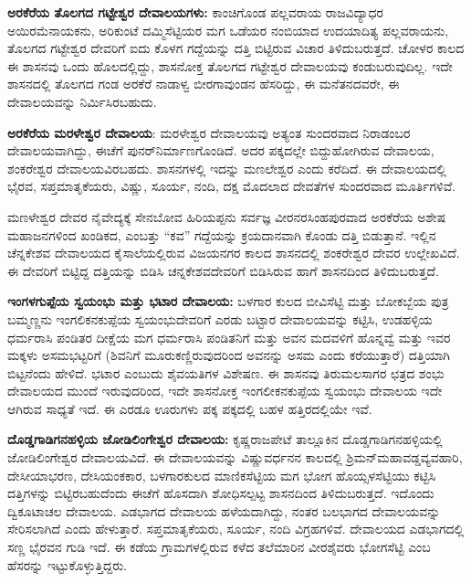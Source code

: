 \textbf{ಅರಕೆರೆಯ ತೊಲಗದ ಗಟ್ಟೇಶ್ವರ ದೇವಾಲಯಗಳು: } ಕಾಂಚಿಗೊಂಡ ಪಲ್ಲವರಾಯ ರಾಜವಿದ್ಯಾಧರ ಅಯಿರಮೆನಾಯಕನು, ಅರಿಕುಂಟೆ ದಮ್ಮಿಸೆಟ್ಟಿಯರ ಮಗ ಒಡೆಯರ ನಂಬಿಯಾದ ಉದಯಾದಿತ್ಯ ಪಲ್ಲವರಾಯನು, ತೊಲಗದ ಗಟ್ಟೇಶ್ವರ ದೇವರಿಗೆ ಐದು ಕೊಳಗ ಗದ್ದೆಯನ್ನು ದತ್ತಿ ಬಿಟ್ಟಿರುವ ವಿಚಾರ ತಿಳಿದುಬರುತ್ತದೆ. ಚೋಳರ ಕಾಲದ ಈ ಶಾಸನವು ಒಂದು ಹೊಲದಲ್ಲಿದ್ದು, ಶಾಸನೋಕ್ತ ತೊಲಗದ ಗಟ್ಟೇಶ್ವರ ದೇವಾಲಯವು ಕಂಡುಬರುವುದಿಲ್ಲ. ಇದೇ ಶಾಸನದಲ್ಲಿ ತೊಲಗದ ಗಂಡ ಅರಕೆರೆ ನಾಡಾಳ್ವ ಬೀರಗಾವುಂಡನ ಹೆಸರಿದ್ದು, ಈ ಮನೆತನದವರೇ, ಈ ದೇವಾಲಯವನ್ನು ನಿರ್ಮಿಸಿರಬಹುದು.

\textbf{ಅರಕೆರೆಯ ಮರಳೇಶ್ವರ ದೇವಾಲಯ}: ಮರಳೇಶ್ವರ ದೇವಾಲಯವು ಅತ್ಯಂತ ಸುಂದರವಾದ ನಿರಾಡಂಬರ ದೇವಾಲಯವಾಗಿದ್ದು, ಈಚೆಗೆ ಪುನರ್​ನಿರ್ಮಾಣಗೊಂಡಿದೆ. ಅದರ ಪಕ್ಕದಲ್ಲೇ ಬಿದ್ದುಹೋಗಿರುವ ದೇವಾಲಯ, ಶಂಕರೇಶ್ವರ ದೇವಾಲಯವಿರಬಹದು. ಶಾಸನಗಳಲ್ಲಿ ಇದನ್ನು ಮಣಲೇಶ್ವರ ಎಂದು ಕರೆದಿದೆ. ಈ ದೇವಾಲಯದಲ್ಲಿ ಭೈರವ, ಸಪ್ತಮಾತೃಕೆಯರು, ವಿಷ್ಣು, ಸೂರ್ಯ, ನಂದಿ, ದಕ್ಷ ಮೊದಲಾದ ದೇವತೆಗಳ ಸುಂದರವಾದ ಮೂರ್ತಿಗಳಿವೆ.

ಮಣಳೇಶ್ವರ ದೇವರ ನೈವೇದ್ಯಕ್ಕೆ ಸೇನಬೋವ ಹಿರಿಯಪ್ಪನು ಸರ್ವಜ್ಞ ವೀರನರಸಿಂಹಪುರವಾದ ಅರಕೆರೆಯ ಅಶೇಷ ಮಹಾಜನಗಳಿಂದ ಖಂಡಿಕದ, ಎಂಬತ್ತು “ಕವ” ಗದ್ದೆಯನ್ನು ಕ್ರಯದಾನವಾಗಿ ಕೊಂಡು ದತ್ತಿ ಬಿಡುತ್ತಾನೆ. ಇಲ್ಲಿನ ಚೆನ್ನಕೇಶವ ದೇವಾಲಯದ ಕೈಸಾಲೆಯಲ್ಲಿರುವ ವಿಜಯನಗರ ಕಾಲದ ಶಾಸನದಲ್ಲಿ ಶಂಕರೇಶ್ವರ ದೇವರ ಉಲ್ಲೇಖವಿದೆ. ಈ ದೇವರಿಗೆ ಬಿಟ್ಟಿದ್ದ ದತ್ತಿಯನ್ನು ಬಿಡಿಸಿ ಚನ್ನಕೇಶವದೇವರಿಗೆ ಬಿಡಿಸಿರುವ ಹಾಗೆ ಶಾಸನದಿಂದ ತಿಳಿದುಬರುತ್ತದೆ.

\textbf{ಇಂಗಳಗುಪ್ಪೆಯ ಸ್ವಯಂಭು ಮತ್ತು ಭಟಾರ ದೇವಾಲಯ:} ಬಳಗಾರ ಕುಲದ ಬೀವಿಸೆಟ್ಟಿ ಮತ್ತು ಬೋಕಬ್ಬೆಯ ಪುತ್ರ ಬಮ್ಮಣ್ಣನು ಇಂಗಲಿಕನಕುಪ್ಪೆಯ ಸ್ವಯಂಭುದೇವರಿಗೆ ಎರಡು ಬಟ್ಟಾರ ದೇವಾಲಯವನ್ನು ಕಟ್ಟಿಸಿ, ಉಡಹಳ್ಳಿಯ ಧರ್ಮರಾಸಿ ಪಂಡಿತರ ದೀಕ್ಷೆಯ ಮಗ ಧರ್ಮರಾಸಿ ಪಂಡಿತನಿಗೆ ಮತ್ತು ಅವನ ಮದವಳಿಗೆ ಹೊನ್ನವ್ವೆ ಮತ್ತು ಇವರ ಮಕ್ಕಳು ಅಸಮಭಟ್ಟರಿಗೆ (ಶಿವನಿಗೆ ಮೂರುಕಣ್ಣಿರುವುದರಿಂದ ಅವನನ್ನು ಅಸಮ ಎಂದು ಕರೆಯುತ್ತಾರೆ) ದತ್ತಿಯಾಗಿ ಬಿಟ್ಟನೆಂದು ಹೇಳಿದೆ. ಭಟಾರ ಎಂಬುದು ಶೈವಯತಿಗಳ ವಿಶೇಷಣ. ಈ ಶಾಸನವು ತಿರುಮಲಸಾಗರ ಛತ್ರದ ಶಂಭು ದೇವಾಲಯದ ಮುಂದೆ ಇರುವುದರಿಂದ, ಇದೇ ಶಾಸನೋಕ್ತ ಇಂಗಲೀಕನಕುಪ್ಪೆಯ ಸ್ವಯಂಭು ದೇವಾಲಯ ಇದೇ ಆಗಿರುವ ಸಾಧ್ಯತೆ ಇದೆ. ಈ ಎರಡೂ ಊರುಗಳು ಪಕ್ಕ ಪಕ್ಕದಲ್ಲಿ ಬಹಳ ಹತ್ತಿರದಲ್ಲಿಯೇ ಇವೆ.

\textbf{ದೊಡ್ಡಗಾಡಿಗನಹಳ್ಳಿಯ ಜೋಡಿಲಿಂಗೇಶ್ವರ ದೇವಾಲಯ:} ಕೃಷ್ಣರಾಜಪೇಟೆ ತಾಲ್ಲೂಕಿನ ದೊಡ್ಡಗಾಡಿಗನಹಳ್ಳಿಯಲ್ಲಿ ಜೋಡಿಲಿಂಗೇಶ್ವರ ದೇವಾಲಯವಿದೆ. ಈ ದೇವಾಲಯವನ್ನು ವಿಷ್ಣುವರ್ಧನನ ಕಾಲದಲ್ಲಿ ಶ್ರಿಮನ್​ ಮಹಾವಡ್ಡವ್ಯವಹಾರಿ, ದೇಸೀಯಾಭರಣ, ದೇಸಿಯಂಕಕಾರ, ಬಳಗಾರಕುಲದ ಮಾಣಿಕಸೆಟ್ಟಿಯ ಮಗ ಭೋಗ ಹೊಯ್ಸಳಸೆಟ್ಟಿಯು ಕಟ್ಟಿಸಿ ದತ್ತಿಗಳನ್ನು ಬಿಟ್ಟಿರಬಹುದೆಂದು ಈಚೆಗೆ ಹೊಸದಾಗಿ ಶೋಧಿಸಲ್ಪಟ್ಟ ಶಾಸನದಿಂದ ತಿಳಿದುಬರುತ್ತದೆ. ಇದೊಂದು ದ್ವಿಕೂಟಾಚಲ ದೇವಾಲಯ. ಎಡಭಾಗದ ದೇವಾಲಯ ಹಳೆಯದಾಗಿದ್ದು, ನಂತರ ಬಲಭಾಗದ ದೇವಾಲಯವನ್ನು ಸೇರಿಸಲಾಗಿದೆ ಎಂದು ಹೇಳುತ್ತಾರೆ. ಸಪ್ತಮಾತೃಕೆಯರು, ಸೂರ್ಯ, ನಂದಿ ವಿಗ್ರಹಗಳಿವೆ. ದೇವಾಲಯದ ಎಡಭಾಗದಲ್ಲಿ ಸಣ್ಣ ಭೈರವನ ಗುಡಿ ಇದೆ. ಈ ಕಡೆಯ ಗ್ರಾಮಗಳಲ್ಲಿರುವ ಕಳೆದ ತಲೆಮಾರಿನ ವೀರಶೈವರು ಭೋಗಸೆಟ್ಟಿ ಎಂಬ ಹೆಸರನ್ನು ಇಟ್ಟುಕೊಳ್ಳುತ್ತಿದ್ದರು.


